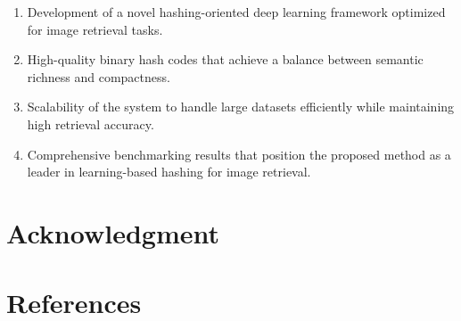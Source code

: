 \documentclass[conference]{IEEEtran}
\begin{document}
\begin{enumerate}
    \item Development of a novel hashing-oriented deep learning framework optimized for image retrieval tasks.
    \item High-quality binary hash codes that achieve a balance between semantic richness and compactness.
    \item Scalability of the system to handle large datasets efficiently while maintaining high retrieval accuracy.
    \item Comprehensive benchmarking results that position the proposed method as a leader in learning-based hashing for image retrieval.
    
\end{enumerate}
\section*{Acknowledgment}

\section*{References}
\end{document}
